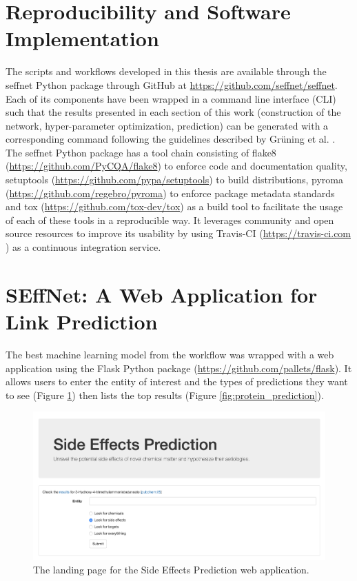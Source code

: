 \section{Reproducibility and Software Implementation}
The scripts and workflows developed in this thesis are available through the seffnet Python package through GitHub at \url{https://github.com/seffnet/seffnet}. Each of its components have been wrapped in a command line interface (CLI) such that the results presented in each section of this work (construction of the network, hyper-parameter optimization, prediction) can be generated with a corresponding command following the guidelines described by Grüning et al. \cite{gruning_software_2019}. 
The seffnet Python package has a tool chain consisting of flake8 (\url{https://github.com/PyCQA/flake8}) to enforce code and documentation quality, setuptools (\url{https://github.com/pypa/setuptools}) to build distributions, pyroma (\url{https://github.com/regebro/pyroma}) to enforce package metadata standards and tox (\url{https://github.com/tox-dev/tox}) as a build tool to facilitate the usage of each of these tools in a reproducible way. It leverages community and open source resources to improve its usability by using Travis-CI (\url{https://travis-ci.com} ) as a continuous integration service.

\section{SEffNet: A Web Application for Link Prediction}
The best machine learning model from the workflow was wrapped with a web application using the Flask Python package (\url{https://github.com/pallets/flask}). It allows users to enter the entity of interest and the types of predictions they want to see (Figure \ref{fig:web_page}) then lists the top results (Figure \ref{fig:protein_prediction}).

\begin{figure}[h!]
    \centering
    \includegraphics[scale=0.35]
    {figures/web_page.png}
    \caption{\label{fig:web_page} The landing page for the Side Effects Prediction web application.}
\end{figure}

